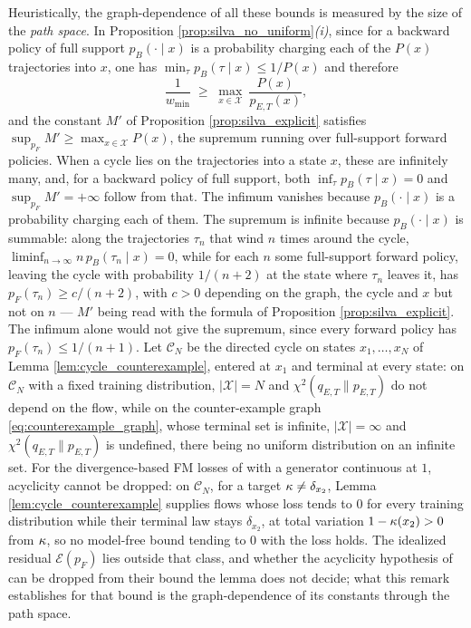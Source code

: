 \begin{remark}\label{rem:path_space}
Heuristically, the graph-dependence of all these bounds is measured by the size of the \emph{path space}. In Proposition \ref{prop:silva_no_uniform}\emph{(i)}, since for a backward policy of full support $p_B(\cdot\mid x)$ is a probability charging each of the $P(x)$ trajectories into $x$, one has $\min_\tau p_B(\tau\mid x)\leq 1/P(x)$ and therefore
\begin{equation}
    \frac{1}{w_{\min}} \;\geq\; \max_{x\in\mathcal X}\ \frac{P(x)}{p_{E,T}(x)} ,
\end{equation}
and the constant $M'$ of Proposition \ref{prop:silva_explicit} satisfies $\sup_{p_F}M'\geq\max_{x\in\mathcal X}P(x)$, the supremum running over full-support forward policies. When a cycle lies on the trajectories into a state $x$, these are infinitely many, and, for a backward policy of full support, both $\inf_\tau p_B(\tau\mid x)=0$ and $\sup_{p_F}M'=+\infty$ follow from that. The infimum vanishes because $p_B(\cdot\mid x)$ is a probability charging each of them. The supremum is infinite because $p_B(\cdot\mid x)$ is summable: along the trajectories $\tau_n$ that wind $n$ times around the cycle, $\liminf_{n\rightarrow\infty} n\,p_B(\tau_n\mid x)=0$, while for each $n$ some full-support forward policy, leaving the cycle with probability $1/(n+2)$ at the state where $\tau_n$ leaves it, has $p_F(\tau_n)\geq c/(n+2)$, with $c>0$ depending on the graph, the cycle and $x$ but not on $n$ --- $M'$ being read with the formula of Proposition \ref{prop:silva_explicit}. The infimum alone would not give the supremum, since every forward policy has $p_F(\tau_n)\leq 1/(n+1)$. Let $\mathcal C_N$ be the directed cycle on states $x_1,\dots,x_N$ of Lemma \ref{lem:cycle_counterexample}, entered at $x_1$ and terminal at every state: on $\mathcal C_N$ with a fixed training distribution, $|\mathcal X|=N$ and $\chi^2(q_{E,T}\|p_{E,T})$ do not depend on the flow, while on the counter-example graph \eqref{eq:counterexample_graph}, whose terminal set is infinite, $|\mathcal X|=\infty$ and $\chi^2(q_{E,T}\|p_{E,T})$ is undefined, there being no uniform distribution on an infinite set. For the divergence-based FM losses of \citet{brunswic2024theory} with a generator continuous at $1$, acyclicity cannot be dropped: on $\mathcal C_N$, for a target $\kappa\neq\delta_{x_2}$, Lemma \ref{lem:cycle_counterexample} supplies flows whose loss tends to $0$ for every training distribution while their terminal law stays $\delta_{x_2}$, at total variation $1-\kappa(x_2)>0$ from $\kappa$, so no model-free bound tending to $0$ with the loss holds. The idealized residual $\mathcal E(p_F)$ lies outside that class, and whether the acyclicity hypothesis of \citet{silvageneralization} can be dropped from their bound the lemma does not decide; what this remark establishes for that bound is the graph-dependence of its constants through the path space.
\end{remark}


